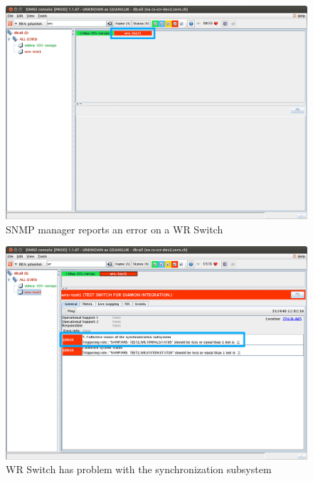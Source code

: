 \begin{figure}
  \begin{center}
    \includegraphics[width=.9\textwidth]{img/wrs_error.png}
    \caption{SNMP manager reports an error on a WR Switch}
    \label{fig:diamon:wrs_error}
  \end{center}
\end{figure}

\begin{figure}
  \begin{center}
    \includegraphics[width=.9\textwidth]{img/wrs_sync_error.png}
    \caption{WR Switch has problem with the synchronization subsystem}
    \label{fig:diamon:wrs_sync_error}
  \end{center}
\end{figure}


